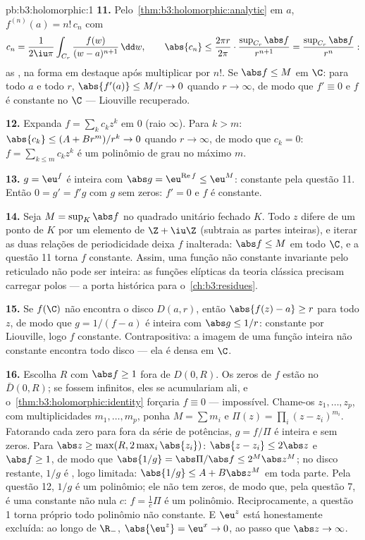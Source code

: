 \begin{solution}{pb:b3:holomorphic:1}
\textbf{11.} Pelo~\cref{thm:b3:holomorphic:analytic} em $a$,
$f^{(n)}(a) = n!\,c_n$ com
\[
c_n = \frac1{2\iu\pi}\int_{C_r}\frac{f(w)}{(w -
a)^{n+1}}\,\dd w,
\qquad
\abs{c_n} \leq \frac{2\pi r}{2\pi}\cdot
\frac{\sup_{C_r}\abs f}{r^{n+1}}
= \frac{\sup_{C_r}\abs f}{r^{n}} :
\]
as , na forma em destaque após
multiplicar por $n!$. Se $\abs f \leq M$ em $\C$: para todo
$a$ e todo $r$, $\abs{f'(a)} \leq M/r \to 0$ quando $r \to
\infty$, de modo que $f' \equiv 0$ e $f$ é constante no
 $\C$ --- Liouville recuperado.

\textbf{12.} Expanda $f = \sum_kc_kz^k$ em $0$ (raio
$\infty$). Para $k > m$: $\abs{c_k} \leq (A + Br^m)/r^k \to
0$ quando $r \to \infty$, de modo que $c_k = 0$: $f =
\sum_{k\leq m}c_kz^k$ é um polinômio de grau no máximo $m$.

\textbf{13.} $g = \eu^f$ é inteira com $\abs g =
\eu^{\operatorname{Re}f} \leq \eu^M$: constante pela questão
11. Então $0 = g' = f'g$ com $g$ sem zeros: $f' = 0$ e $f$
é constante.

\textbf{14.} Seja $M = \sup_K\abs f$ no quadrado unitário fechado
 $K$. Todo $z$ difere de um ponto de $K$ por um
elemento de $\Z + \iu\Z$ (subtraia as partes inteiras), e
iterar as duas relações de periodicidade deixa $f$
inalterada: $\abs f \leq M$ em todo $\C$, e a questão 11
torna $f$ constante. Assim, uma função não constante invariante
pelo reticulado não pode ser inteira: as funções elípticas
da teoria clássica precisam carregar polos --- a porta histórica
para o~\cref{ch:b3:residues}.

\textbf{15.} Se $f(\C)$ não encontra o disco $D(a, r)$, então
$\abs{f(z) - a} \geq r$ para todo $z$, de modo que $g = 1/(f - a)$ é
inteira com $\abs g \leq 1/r$: constante por Liouville, logo
$f$ constante. Contrapositiva: a imagem de uma função inteira
não constante encontra todo disco --- ela é densa em $\C$.

\textbf{16.} Escolha $R$ com $\abs f \geq 1$ fora de
$D(0, R)$. Os zeros de $f$ estão no 
$\bar D(0, R)$; se fossem infinitos, eles se acumulariam
ali, e o~\cref{thm:b3:holomorphic:identity} forçaria $f
\equiv 0$ --- impossível. Chame-os $z_1, \dots, z_p$, com
multiplicidades $m_1, \dots, m_p$, ponha $M = \sum m_i$ e
$\Pi(z) = \prod_i(z - z_i)^{m_i}$. Fatorando cada zero para fora
da série de potências, $g = f/\Pi$ é inteira e sem zeros.
Para $\abs z \geq \max(R, 2\max_i\abs{z_i})$: $\abs{z - z_i}
\leq 2\abs z$ e $\abs f \geq 1$, de modo que $\abs{1/g} =
\abs\Pi/\abs f \leq 2^M\abs z^M$; no disco 
restante, $1/g$ é , logo limitada: $\abs{1/g} \leq A +
B\abs z^M$ em toda parte. Pela questão 12, $1/g$ é um
polinômio; ele não tem zeros, de modo que, pela questão 7, é uma
constante não nula $c$: $f = \frac1c\Pi$ é um polinômio.
Reciprocamente, a questão 1 torna próprio todo polinômio não constante.
E $\eu^z$ está honestamente excluída: ao longo de $\R_-$,
$\abs{\eu^z} = \eu^x \to 0$, ao passo que $\abs z \to \infty$.


\end{solution}
